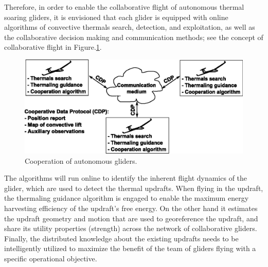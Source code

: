 \documentclass[letterpaper, 10 pt, conference]{ieeeconf}  %
\newcommand{\squeezeup}{\vspace{-1.0mm}}
\begin{document}
Therefore, in order to enable the collaborative flight of autonomous thermal soaring gliders, it is envisioned that each glider is equipped with online algorithms of convective thermals search, detection, and exploitation, as well as the collaborative decision making and communication methods; see the concept of collaborative flight in Figure.\ref{fig:coop_scheme}.
\begin{figure}[thpb]
  \centering
  \includegraphics[scale=0.5]{Figures/coop_scheme_small.eps}
  \caption{Cooperation of autonomous gliders.}
  \label{fig:coop_scheme}
\end{figure}
\squeezeup
The algorithms will run online to identify the inherent flight dynamics of the glider, which are used to detect the thermal updrafts. When flying in the updraft, the thermaling guidance algorithm is engaged to enable the maximum energy harvesting efficiency of the updraft’s free energy. On the other hand it estimates the updraft geometry and motion that are used to georeference the updraft, and share its utility properties (strength) across the network of collaborative gliders. Finally, the distributed knowledge about the existing updrafts needs to be intelligently utilized to maximize the benefit of the team of gliders flying with a specific operational objective.
\end{document}
